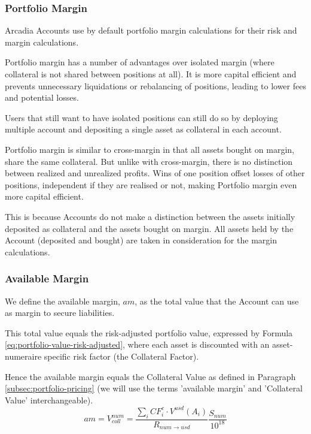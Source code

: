 \documentclass[sigconf,nonacm]{acmart}
\begin{document}
\subsubsection{Portfolio Margin}
Arcadia Accounts use by default portfolio margin calculations for their risk and margin calculations.

Portfolio margin has a number of advantages over isolated margin (where collateral is not shared between positions at all).
It is more capital efficient and prevents unnecessary liquidations or rebalancing of positions, leading to lower fees and potential losses.

Users that still want to have isolated positions can still do so by deploying multiple account and depositing a single asset as collateral in each account.

Portfolio margin is similar to cross-margin in that all assets bought on margin, share the same collateral.
But unlike with cross-margin, there is no distinction between realized and unrealized profits.
Wins of one position offset losses of other positions, independent if they are realised or not,
making Portfolio margin even more capital efficient.

This is because Accounts do not make a distinction between the assets initially deposited as collateral and the assets bought on margin.
All assets held by the Account (deposited and bought) are taken in consideration for the margin calculations.

\subsubsection{Available Margin}
\label{subsubsec:available-margin}
We define the available margin, $am$, as the total value that the Account can use as margin to secure liabilities.

This total value equals the risk-adjusted portfolio value, expressed by Formula \ref{eq:portfolio-value-risk-adjusted},
where each asset is discounted with an asset-numeraire specific risk factor (the Collateral Factor).

Hence the available margin equals the Collateral Value as defined in Paragraph \ref{subsec:portfolio-pricing}
(we will use the terms 'available margin' and 'Collateral Value' interchangeable).
\begin{equation}
    \label{eq:available-margin}
    am = V_{coll}^{num} = \frac{\sum_{i}{CF_{i}^{c} \cdot V^{usd}(A_{i})}}{R_{num\rightarrow usd}}\frac{S_{num}}{10^{18}}
\end{equation}
\end{document}
